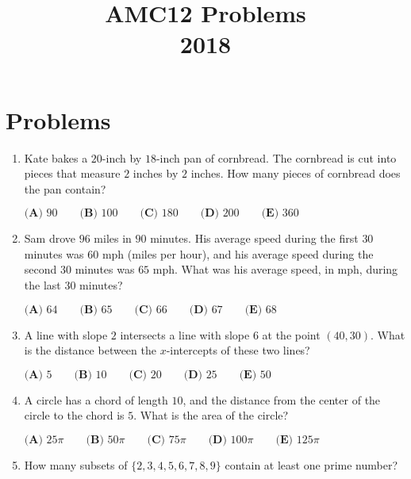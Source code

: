 \documentclass{article}
\title{AMC12 Problems \\ 2018}
\date{}
\begin{document}
\maketitle\thispagestyle{fancy}\newpage\section*{Problems}\begin{enumerate}[label=\arabic*., itemsep=0.5em]\item Kate bakes a \(20\)-inch by \(18\)-inch pan of cornbread. The cornbread is cut into pieces that measure \(2\) inches by \(2\) inches. How many pieces of cornbread does the pan contain?

\(\textbf{(A) } 90 \qquad \textbf{(B) } 100 \qquad \textbf{(C) } 180 \qquad \textbf{(D) } 200 \qquad \textbf{(E) } 360\)\par \vspace{0.5em}\item Sam drove \(96\) miles in \(90\) minutes. His average speed during the first \(30\) minutes was \(60\) mph (miles per hour), and his average speed during the second \(30\) minutes was \(65\) mph. What was his average speed, in mph, during the last \(30\) minutes?

\(
\textbf{(A) } 64 \qquad
\textbf{(B) } 65 \qquad
\textbf{(C) } 66 \qquad
\textbf{(D) } 67 \qquad
\textbf{(E) } 68
\)\par \vspace{0.5em}\item A line with slope \(2\) intersects a line with slope \(6\) at the point \((40,30)\). What is the distance between the \(x\)-intercepts of these two lines? 

\(\textbf{(A) } 5 \qquad \textbf{(B) } 10 \qquad \textbf{(C) } 20 \qquad \textbf{(D) } 25 \qquad \textbf{(E) } 50\)\par \vspace{0.5em}\item A circle has a chord of length \(10\), and the distance from the center of the circle to the chord is \(5\). What is the area of the circle?

\(
\textbf{(A) }25\pi \qquad
\textbf{(B) }50\pi \qquad
\textbf{(C) }75\pi \qquad
\textbf{(D) }100\pi \qquad
\textbf{(E) }125\pi \qquad
\)\par \vspace{0.5em}\item How many subsets of \(\{2,3,4,5,6,7,8,9\}\) contain at least one prime number?


\end{enumerate}
\end{document}
